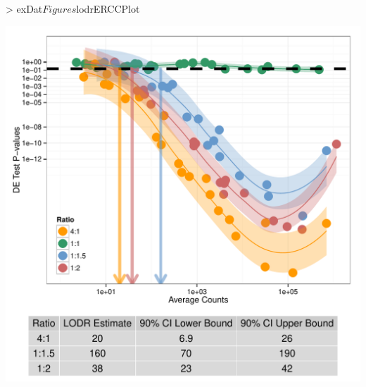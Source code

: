 \documentclass{article}
\begin{document}
\clearpage
\begin{center}
\begin{Schunk}
\begin{Sinput}
> exDat$Figures$lodrERCCPlot
\end{Sinput}
\end{Schunk}
\includegraphics{erccdashboardVignette-seqcCountPlotC}
\end{center}
\end{document}
